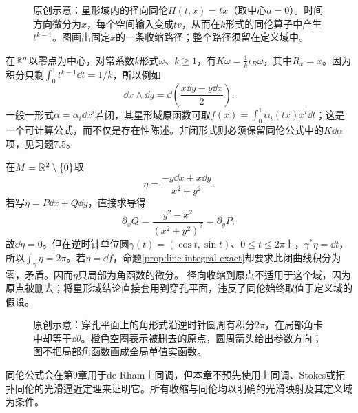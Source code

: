 \begin{figure}[htbp]
\centering
\caption{原创示意：星形域内的径向同伦$H(t,x)=tx$（取中心$a=0$）。时间方向微分为$x$，每个空间输入变成$tv$，从而在$k$形式的同伦算子中产生$t^{k-1}$。图画出固定$x$的一条收缩路径；整个路径须留在定义域中。}
\label{fig:radial-homotopy}
\end{figure}
\begin{example}[常系数形式的显式原形式]
在$\mathbb{R}^n$以零点为中心，对常系数$k$形式$\omega$、$k\geq1$，有$K\omega=\frac1k\iota_R\omega$，其中$R_x=x$。因为积分只剩$\int_0^1t^{k-1}\dd t=1/k$，所以例如
\[
 \dd x\wedge\dd y=\dd\!\left(\frac{x\dd y-y\dd x}{2}\right).
\]
一般一形式$\alpha=\alpha_i\dd x^i$若闭，其星形域原函数可取$f(x)=\int_0^1\alpha_i(tx)x^i\dd t$；这是一个可计算公式，而不仅是存在性陈述。非闭形式则必须保留同伦公式中的$K\dd\alpha$项，见习题7.5。
\end{example}
\begin{example}[穿孔平面上的闭而不恰当形式]\label{ex:angular-form}
在$M=\mathbb{R}^2\setminus\{0\}$取
\[
 \eta=\frac{-y\dd x+x\dd y}{x^2+y^2}.
\]
若写$\eta=P\dd x+Q\dd y$，直接求导得
\[
 \partial_xQ=\frac{y^2-x^2}{(x^2+y^2)^2}=\partial_yP,
\]
故$\dd\eta=0$。但在逆时针单位圆$\gamma(t)=(\cos t,\sin t)$、$0\leq t\leq2\pi$上，$\gamma^*\eta=\dd t$，所以$\int_\gamma\eta=2\pi$。若$\eta=\dd f$，命题\ref{prop:line-integral-exact}却要求此闭曲线积分为零，矛盾。因而$\eta$只局部为角函数的微分。
径向收缩到原点不适用于这个域，因为原点被删去；将星形域结论直接套用到穿孔平面，违反了同伦始终取值于定义域的假设。
\end{example}
\begin{figure}[htbp]
\centering
\caption{原创示意：穿孔平面上的角形式沿逆时针圆周有积分$2\pi$，在局部角卡中却等于$\dd\theta$。橙色空圈表示被删去的原点，圆周箭头给出参数方向；图不把局部角函数画成全局单值实函数。}
\label{fig:angular-obstruction}
\end{figure}
同伦公式会在第9章用于de Rham上同调，但本章不预先使用上同调、Stokes或拓扑同伦的光滑逼近定理来证明它。所有收缩与同伦均以明确的光滑映射及其定义域为条件。
